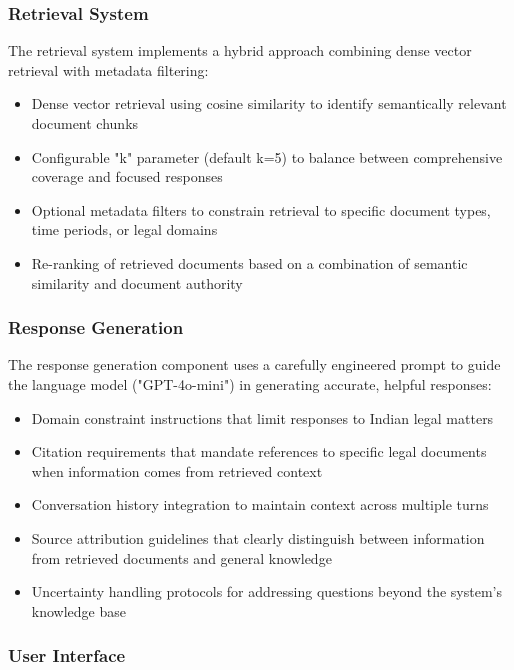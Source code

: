 \documentclass[conference]{IEEEtran}
\begin{document}
\subsubsection{Retrieval System}

The retrieval system implements a hybrid approach combining dense vector retrieval with metadata filtering:

\begin{itemize}
    \item Dense vector retrieval using cosine similarity to identify semantically relevant document chunks
    \item Configurable "k" parameter (default k=5) to balance between comprehensive coverage and focused responses
    \item Optional metadata filters to constrain retrieval to specific document types, time periods, or legal domains
    \item Re-ranking of retrieved documents based on a combination of semantic similarity and document authority
\end{itemize}

\subsubsection{Response Generation}

The response generation component uses a carefully engineered prompt to guide the language model ("GPT-4o-mini") in generating accurate, helpful responses:

\begin{itemize}
    \item Domain constraint instructions that limit responses to Indian legal matters
    \item Citation requirements that mandate references to specific legal documents when information comes from retrieved context
    \item Conversation history integration to maintain context across multiple turns
    \item Source attribution guidelines that clearly distinguish between information from retrieved documents and general knowledge
    \item Uncertainty handling protocols for addressing questions beyond the system's knowledge base
\end{itemize}

\subsubsection{User Interface}
\end{document}
